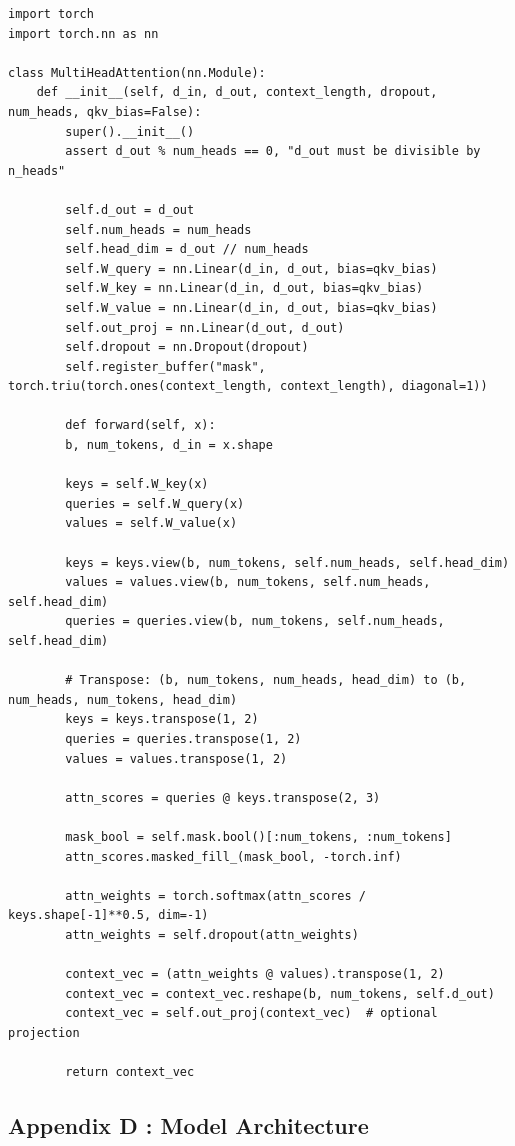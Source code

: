 \begin{lstlisting}
import torch
import torch.nn as nn

class MultiHeadAttention(nn.Module):
	def __init__(self, d_in, d_out, context_length, dropout, num_heads, qkv_bias=False):
		super().__init__()
		assert d_out % num_heads == 0, "d_out must be divisible by n_heads"
	
		self.d_out = d_out
		self.num_heads = num_heads
		self.head_dim = d_out // num_heads  
		self.W_query = nn.Linear(d_in, d_out, bias=qkv_bias)
		self.W_key = nn.Linear(d_in, d_out, bias=qkv_bias)
		self.W_value = nn.Linear(d_in, d_out, bias=qkv_bias)
		self.out_proj = nn.Linear(d_out, d_out)  
		self.dropout = nn.Dropout(dropout)
		self.register_buffer("mask", torch.triu(torch.ones(context_length, context_length), diagonal=1))
		
		def forward(self, x):
		b, num_tokens, d_in = x.shape
		
		keys = self.W_key(x) 
		queries = self.W_query(x)
		values = self.W_value(x)
		
		keys = keys.view(b, num_tokens, self.num_heads, self.head_dim)
		values = values.view(b, num_tokens, self.num_heads, self.head_dim)
		queries = queries.view(b, num_tokens, self.num_heads, self.head_dim)
		
		# Transpose: (b, num_tokens, num_heads, head_dim) to (b, num_heads, num_tokens, head_dim)
		keys = keys.transpose(1, 2)
		queries = queries.transpose(1, 2)
		values = values.transpose(1, 2)
		
		attn_scores = queries @ keys.transpose(2, 3) 
		
		mask_bool = self.mask.bool()[:num_tokens, :num_tokens]
		attn_scores.masked_fill_(mask_bool, -torch.inf)
		
		attn_weights = torch.softmax(attn_scores / keys.shape[-1]**0.5, dim=-1)
		attn_weights = self.dropout(attn_weights)
		
		context_vec = (attn_weights @ values).transpose(1, 2)
		context_vec = context_vec.reshape(b, num_tokens, self.d_out)
		context_vec = self.out_proj(context_vec)  # optional projection
		
		return context_vec
\end{lstlisting}
\pagebreak

\subsection*{Appendix D : Model Architecture}


